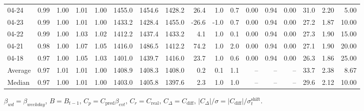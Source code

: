 \begin{threeparttable}
{\begin{tabular}{lrrrrrrrrrrrrrrrr}
  04-24 &         0.99 &           1.00 &          1.01 &          1.00 & 1455.0 & 1454.6 & 1428.2 &       26.4 &                      1.0 &                 0.7 &       0.00 &      0.94 &           0.00 &             31.0 &            2.20 &                   5.00 \\
  04-23 &         0.99 &           1.00 &          1.01 &          1.00 & 1433.2 & 1428.4 & 1455.0 &      -26.6 &                     -1.0 &                 0.7 &       0.00 &      0.94 &           0.00 &             27.2 &            1.87 &                  10.00 \\
  04-22 &         0.99 &           1.00 &          1.03 &          1.02 & 1412.2 & 1437.4 & 1433.2 &        4.1 &                      1.0 &                 0.1 &       0.00 &      0.94 &           0.00 &             27.3 &            1.90 &                  15.00 \\
  04-21 &         0.98 &           1.00 &          1.07 &          1.05 & 1416.0 & 1486.5 & 1412.2 &       74.2 &                      1.0 &                 2.0 &       0.00 &      0.94 &           0.00 &             27.1 &            1.90 &                  20.00 \\
  04-18 &         0.97 &           1.00 &          1.05 &          1.03 & 1401.0 & 1439.7 & 1416.0 &       23.7 &                      1.0 &                 0.6 &       0.00 &      0.94 &           0.00 &             26.3 &            1.86 &                  25.00 \\
Average &         0.97 &           1.01 &          1.01 &          1.00 & 1408.9 & 1408.3 & 1408.0 &        0.2 &                      0.1 &                 1.1 &         -- &        -- &             -- &             33.7 &            2.38 &                   8.67 \\
 Median &         0.97 &           1.00 &          1.01 &          1.00 & 1403.0 & 1405.8 & 1397.6 &        2.3 &                      1.0 &                 1.0 &         -- &        -- &             -- &             29.6 &            2.12 &                  10.00 \\
\bottomrule
\end{tabular}
}
\begin{tablenotes}\footnotesize
\item $\beta_{wd}=\beta_{weekday}$, $B=B_{t-1}$,
$C_p=C_{\text{pred}}\beta_{evt}$, $C_r=C_{\text{real}}$,
$C_\Delta=C_{\text{diff}}$, $|C_\Delta|/\sigma=|C_{\text{diff}}|/\sigma_t^{\text{shift}}$.
\end{tablenotes}
\end{threeparttable}
\endgroup
